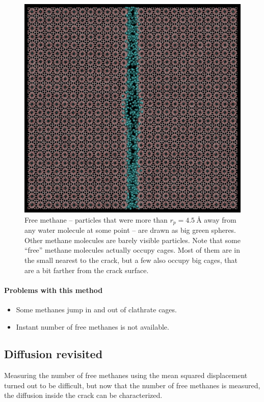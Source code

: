 \begin{figure}
\includegraphics[width=\textwidth]{../pictures/free_methane.pdf}
\caption{Free methane -- particles that were more than $r_p = \SI{4.5}{\angstrom}$ away from any water molecule at some point -- are drawn as big green spheres. Other methane molecules are barely visible particles. Note that some ``free'' methane molecules actually occupy cages. Most of them are in the small nearest to the crack, but a few also occupy big cages, that are a bit farther from the crack surface. }
\label{fig:free_methane}
\end{figure}

\paragraph{Problems with this method}
\begin{itemize}
\item Some methanes jump in and out of clathrate cages. 
\item Instant number of free methanes is not available.
\end{itemize}

\subsection{Diffusion revisited}
Measuring the number of free methanes using the mean squared displacement turned out to be difficult, but now that the number of free methanes is measured, the diffusion inside the crack can be characterized.

